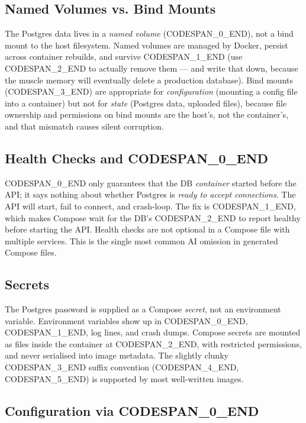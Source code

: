 \documentclass[11pt,a4paper]{book}
\begin{document}
\subsection{Named Volumes vs. Bind Mounts}

The Postgres data lives in a \textit{named volume} (CODESPAN\_0\_END), not a bind mount to the host filesystem. Named volumes are managed by Docker, persist across container rebuilds, and survive CODESPAN\_1\_END (use CODESPAN\_2\_END to actually remove them --- and write that down, because the muscle memory will eventually delete a production database). Bind mounts (CODESPAN\_3\_END) are appropriate for \textit{configuration} (mounting a config file into a container) but not for \textit{state} (Postgres data, uploaded files), because file ownership and permissions on bind mounts are the host's, not the container's, and that mismatch causes silent corruption.

\subsection{Health Checks and CODESPAN\_0\_END}

CODESPAN\_0\_END only guarantees that the DB \textit{container} started before the API; it says nothing about whether Postgres is \textit{ready to accept connections}. The API will start, fail to connect, and crash-loop. The fix is CODESPAN\_1\_END, which makes Compose wait for the DB's CODESPAN\_2\_END to report healthy before starting the API. Health checks are not optional in a Compose file with multiple services. This is the single most common AI omission in generated Compose files.

\subsection{Secrets}

The Postgres password is supplied as a Compose \textit{secret}, not an environment variable. Environment variables show up in CODESPAN\_0\_END, CODESPAN\_1\_END, log lines, and crash dumps. Compose secrets are mounted as files inside the container at CODESPAN\_2\_END, with restricted permissions, and never serialised into image metadata. The slightly clunky CODESPAN\_3\_END suffix convention (CODESPAN\_4\_END, CODESPAN\_5\_END) is supported by most well-written images.

\subsection{Configuration via CODESPAN\_0\_END}
\end{document}
